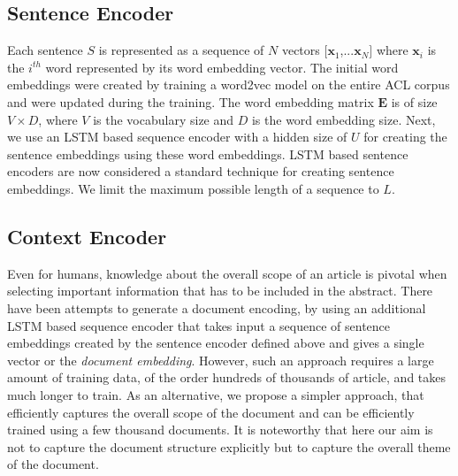\subsection{Sentence Encoder} 
Each sentence $S$ is represented as a sequence of $N$ vectors $[\boldsymbol{x}_1$,...$\boldsymbol{x}_N]$ where $\boldsymbol{x}_i$ is the $i^{th}$ word represented by its word embedding vector. The initial word embeddings were created by training a word2vec\cite{mikolov2013efficient} model on the entire ACL corpus and were updated during the training. The word embedding matrix $\boldsymbol{E}$ is of size $V\times D$, where $V$ is the vocabulary size and $D$ is the word embedding size.
Next, we use an LSTM based sequence encoder with a hidden size of $U$ for creating the sentence embeddings using these word embeddings. LSTM based sentence encoders are now considered a standard technique for creating sentence embeddings. We limit the maximum possible length of a sequence to $L$.

\subsection{Context Encoder} Even for humans, knowledge about the overall scope of an article is pivotal when selecting important information that has to be included in the abstract. There have been attempts to generate a document encoding, by using an additional LSTM based sequence encoder that takes input a sequence of sentence embeddings created by the sentence encoder defined above\cite{cheng2016neural} and gives a single vector or the \emph{document embedding}. However, such an approach requires a large amount of training data, of the order hundreds of thousands of article, and takes much longer to train. As an alternative, we propose a simpler approach, that efficiently captures the overall scope of the document and can be efficiently trained using a few thousand documents. It is noteworthy that here our aim is not to capture the document structure explicitly but to capture the overall theme of the document.


